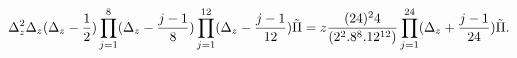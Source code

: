 \begin{equation}
\label{eq:PF4}
\Delta^2_z\Delta_z(\Delta_z-{1\over2})\prod_{j=1}^8(\Delta_z-{j-1\over8})\prod_{j=1}^{12}
(\Delta_z-{j-1\over12})\tilde{\Pi}
=z{(24)^24\over(2^2.8^8.12^{12})}\prod_{j=1}^{24}(\Delta_z+{j-1\over24})\tilde{\Pi}.
\end{equation}


